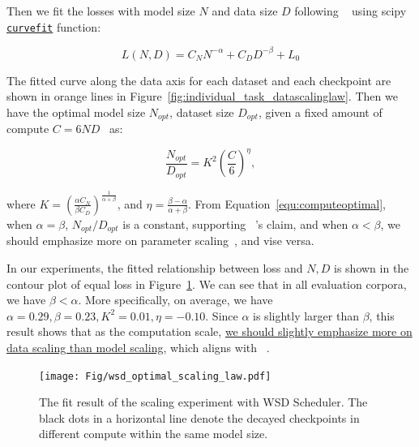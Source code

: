 Then we fit the losses with model size $N$ and data size $D$ following ~\cite{hoffmann2022training} using scipy \uline{\texttt{curvefit}} function:

\begin{equation}
    L(N, D) = C_NN^{-\alpha} + C_DD^{-\beta} + L_0
\label{equ:scalinglaw}
\end{equation}

The fitted curve along the data axis for each dataset and each checkpoint are shown in orange lines in Figure~\ref{fig:individual_task_datascalinglaw}.
Then we have the optimal model size $N_{opt}$, dataset size $D_{opt}$, given a fixed amount of compute $C=6ND$~\citep{rae2021scaling} as: 

\begin{equation}
    \frac{N_{opt}}{D_{opt}} = K^2\left(\frac{C}{6}\right)^{\eta},
\label{equ:computeoptimal}
\end{equation}

where $K = (\frac{\alpha C_N}{\beta C_D})^{\frac{1}{\alpha + \beta}} $, and $\eta=\frac{\beta-\alpha}{\alpha+\beta}$. From Equation~\ref{equ:computeoptimal}, when $\alpha = \beta$, $N_{opt}/D_{opt}$ is a constant, supporting ~\cite{hoffmann2022training}'s claim, and when $\alpha < \beta$, we should emphasize more on parameter scaling~\citep{kaplan2020scaling}, and vise versa. 

In our experiments, the fitted relationship between loss and $N, D$ is shown in the contour plot of equal loss in Figure~\ref{fig:wsd_optimalscalinglaw_text}. We can see that in all evaluation corpora, we have $\beta < \alpha$. More specifically, on average, we have $\alpha=0.29, \beta=0.23, K^2 = 0.01, \eta=-0.10$. Since $\alpha$ is slightly larger than $\beta$, this result shows that as the computation scale, \uline{we should slightly emphasize more on data scaling than model scaling}, which aligns with ~\cite{hoffmann2022training}.

\begin{figure}[!t]
    \centering
    \texttt{[image: Fig/wsd\_optimal\_scaling\_law.pdf]}
    \caption{The fit result of the scaling experiment with WSD Scheduler. The black dots in a horizontal line denote the decayed checkpoints in different compute within the same model size.}
    \label{fig:wsd_optimalscalinglaw_text}
\end{figure}

